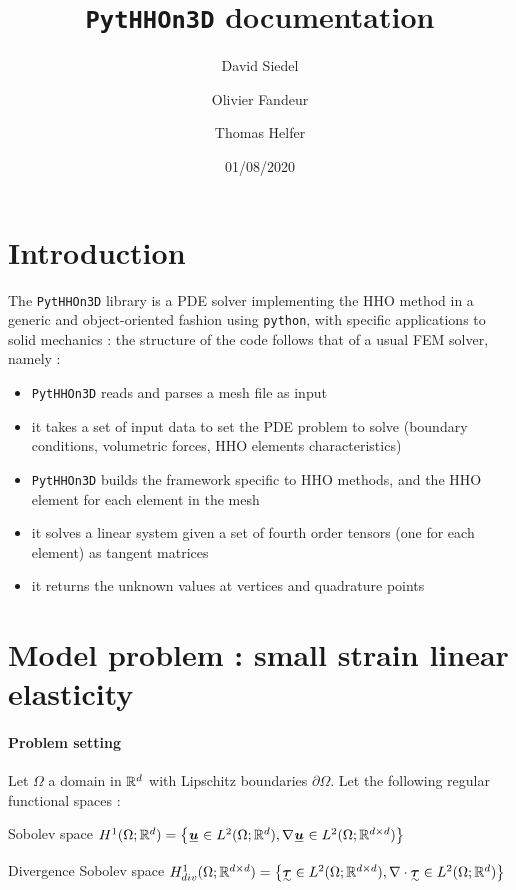 \documentclass[fleqn]{article}
\title{\texttt{PytHHOn3D} documentation}
\author{David Siedel \and Olivier Fandeur \and  Thomas Helfer}
\date{01/08/2020}
\newcommand{\Hdiv}{
  H^1_{div}(\Omega; \mathbb{R}^{d \times d})
}
\newcommand{\Hone}{
  H^{1}(\Omega; \mathbb{R}^{d})
}
\begin{document}
  \maketitle
  
  \section{Introduction}
      The \texttt{PytHHOn3D} library is a PDE solver implementing the HHO method in a generic and object-oriented fashion using \texttt{python}, with specific applications to solid mechanics : the structure of the code follows that of a usual FEM solver, namely :
      \begin{itemize}
        \item \texttt{PytHHOn3D} reads and parses a mesh file as input
        \item it takes a set of input data to set the PDE problem to solve (boundary conditions, volumetric forces, HHO elements characteristics)
        \item \texttt{PytHHOn3D} builds the framework specific to HHO methods, and the HHO element for each element in the mesh
        \item it solves a linear system given a set of fourth order tensors (one for each element) as tangent matrices
        \item it returns the unknown values at vertices and quadrature points
      \end{itemize}

  \newpage

  \section{Model problem : small strain linear elasticity}

    \paragraph{Problem setting}

      Let $\Omega$ a domain in $\mathbb{R}^d$ with Lipschitz boundaries $\partial \Omega$. Let the following regular functional spaces :

      \begin{defbox}{Sobolev space}
        $\Hone = \big\{ \tensori{u} \in L^2(\Omega;\mathbb{R}^{d}), \nabla \tensori{u} \in L^2(\Omega;\mathbb{R}^{d \times d}) \big\}$
      \end{defbox}

      \begin{defbox}{Divergence Sobolev space}
        $\Hdiv = \big\{ \tensorii{\tau} \in L^2(\Omega;\mathbb{R}^{d \times d}), \nabla \cdot \tensorii{\tau} \in L^2(\Omega;\mathbb{R}^{d}) \big\}$
      \end{defbox}
\end{document}
